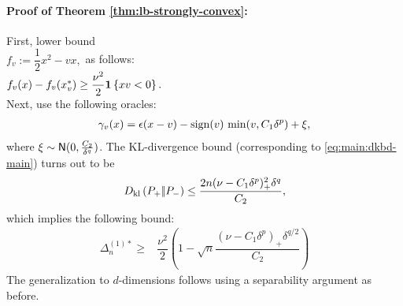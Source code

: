 

\paragraph{Proof of Theorem \ref{thm:lb-strongly-convex}:}

First, lower bound \\$f_v:=\dfrac{1}{2} x^2 - v x,$ as follows: \\$f_v(x) - f_v(x^*_v)
\ge  \dfrac{\nu^2}{2}  \mathbf{1}\left\{x v  < 0\right\}.$\\
Next, use the following oracles:
\begin{align}
 \gamma_v(x) = \epsilon(x-v) - \mathop{\rm sign}(v)\, \min(v,C_1 \delta^p) + \xi, \label{eq:main:oracle-1d}
\end{align}
where $\xi \sim \mathsf{N}(0,\frac{C_2}{\delta^q})$.
The KL-divergence bound (corresponding to \eqref{eq:main:dkbd-main}) turns out to be 
\begin{align}
D_{\rm kl}\left({P_{+}} |\!| {P_{-}} \right) \le \dfrac{2n(\nu-C_1\delta^p)_+^2 \delta^q}{C_2},\label{eq:main:dkbd-sc-main}
\end{align}
which implies the following bound:
\begin{align}
 \Delta_n^{(1)*}
  \ge & \dfrac{\nu^2}{2} \left(1 - \sqrt{
    n}  \dfrac{(\nu-C_1\delta^p)_+\delta^{q/2}}{C_2}
  \right)\label{eq:main:final-lower-bd-sc}
\end{align}
The generalization to $d$-dimensions follows using a separability argument as before.



